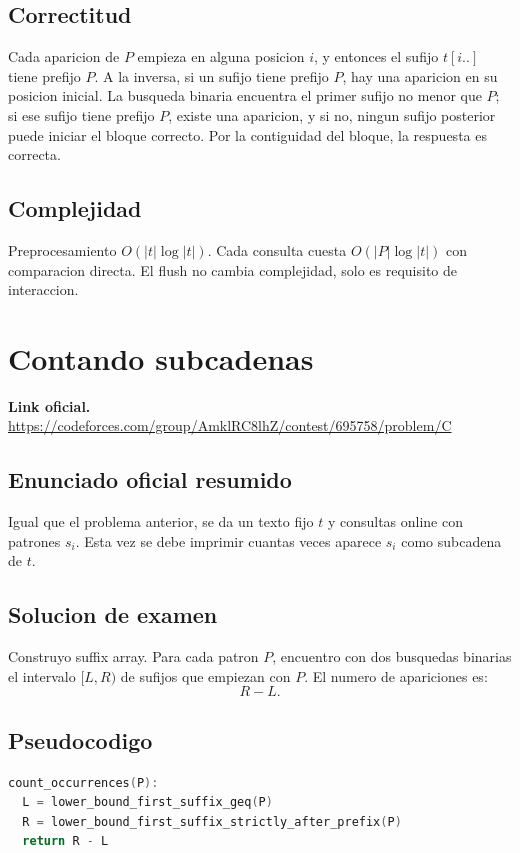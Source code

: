 \documentclass[10pt]{article}
\newcommand{\bigO}{O}
\begin{document}
\subsection{Correctitud}
Cada aparicion de $P$ empieza en alguna posicion $i$, y entonces el sufijo
$t[i..]$ tiene prefijo $P$. A la inversa, si un sufijo tiene prefijo $P$, hay
una aparicion en su posicion inicial. La busqueda binaria encuentra el primer
sufijo no menor que $P$; si ese sufijo tiene prefijo $P$, existe una aparicion,
y si no, ningun sufijo posterior puede iniciar el bloque correcto. Por la
contiguidad del bloque, la respuesta es correcta.

\subsection{Complejidad}
Preprocesamiento $\bigO(|t|\log |t|)$. Cada consulta cuesta
$\bigO(|P|\log |t|)$ con comparacion directa. El flush no cambia complejidad,
solo es requisito de interaccion.

\newpage

\section{Contando subcadenas}
\textbf{Link oficial.} \url{https://codeforces.com/group/AmklRC8lhZ/contest/695758/problem/C}

\subsection{Enunciado oficial resumido}
Igual que el problema anterior, se da un texto fijo $t$ y consultas online con
patrones $s_i$. Esta vez se debe imprimir cuantas veces aparece $s_i$ como
subcadena de $t$.

\subsection{Solucion de examen}
Construyo suffix array. Para cada patron $P$, encuentro con dos busquedas
binarias el intervalo $[L,R)$ de sufijos que empiezan con $P$. El numero de
apariciones es:
\[
R-L.
\]

\subsection{Pseudocodigo}
\begin{lstlisting}[language=C++]
count_occurrences(P):
  L = lower_bound_first_suffix_geq(P)
  R = lower_bound_first_suffix_strictly_after_prefix(P)
  return R - L
\end{lstlisting}
\end{document}
